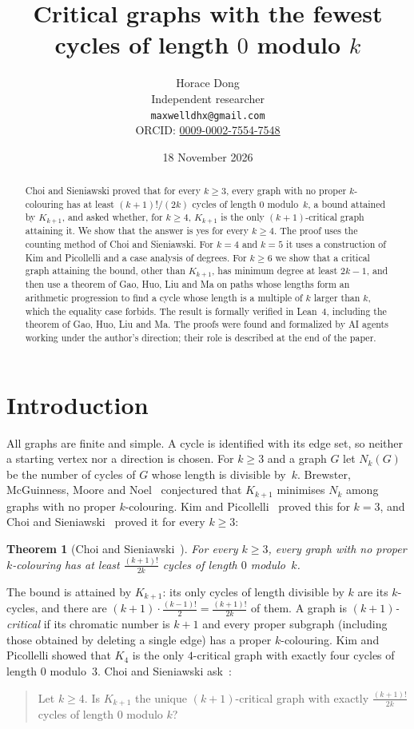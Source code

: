 \documentclass[11pt]{article}
\title{Critical graphs with the fewest cycles of length $0$ modulo $k$}
\author{Horace Dong\\ \small Independent researcher\\
\small\texttt{maxwelldhx@gmail.com}\\
\small ORCID: \href{https://orcid.org/0009-0002-7554-7548}{0009-0002-7554-7548}}
\date{18 November 2026}
\newtheorem{theorem}{Theorem}
\theoremstyle{remark}
\begin{document}
\maketitle

\begin{abstract}
Choi and Sieniawski proved that for every $k\ge3$, every graph with no proper
$k$-colouring has at least $(k+1)!/(2k)$ cycles of length $0$ modulo~$k$, a
bound attained by $K_{k+1}$, and asked whether, for $k\ge4$, $K_{k+1}$ is the
only $(k+1)$-critical graph attaining it. We show that the answer is yes for
every $k\ge4$. The proof uses the counting method of Choi and Sieniawski. For
$k=4$ and $k=5$ it uses a construction of Kim and Picollelli and a case
analysis of degrees. For $k\ge6$ we show that a critical graph attaining the
bound, other than $K_{k+1}$, has minimum degree at least $2k-1$, and then use
a theorem of Gao, Huo, Liu and Ma on paths whose lengths form an arithmetic
progression to find a cycle whose length is a multiple of $k$ larger than $k$,
which the equality case forbids. The result is formally verified in Lean~4,
including the theorem of Gao, Huo, Liu and Ma.
The proofs were found and formalized by AI agents working under the author's
direction; their role is described at the end of the paper.
\end{abstract}

\section{Introduction}

All graphs are finite and simple. A cycle is identified with its edge set, so
neither a starting vertex nor a direction is chosen. For $k\ge3$ and a graph $G$
let $N_k(G)$ be the number of cycles of $G$ whose length is divisible by~$k$.
Brewster, McGuinness, Moore and Noel~\cite{bmmn} conjectured that $K_{k+1}$
minimises $N_k$ among graphs with no proper $k$-colouring. Kim and
Picollelli~\cite{kp} proved this for $k=3$, and Choi and
Sieniawski~\cite{cs} proved it for every $k\ge3$:

\begin{theorem}[{Choi and Sieniawski~\cite[Theorem~3]{cs}}]\label{thm:cs}
For every $k\ge3$, every graph with no proper $k$-colouring has at least
$\frac{(k+1)!}{2k}$ cycles of length $0$ modulo~$k$.
\end{theorem}

The bound is attained by $K_{k+1}$: its only cycles of length divisible by $k$
are its $k$-cycles, and there are $(k+1)\cdot\frac{(k-1)!}{2}=\frac{(k+1)!}{2k}$
of them. A graph is \emph{$(k+1)$-critical} if its chromatic number is $k+1$ and
every proper subgraph (including those obtained by deleting a single edge) has a
proper $k$-colouring. Kim and Picollelli showed that $K_4$ is the only
$4$-critical graph with exactly four cycles of length $0$ modulo~$3$. Choi and
Sieniawski ask~\cite[Question~8]{cs}:
\begin{quote}
Let $k\ge4$. Is $K_{k+1}$ the unique $(k+1)$-critical graph with exactly
$\frac{(k+1)!}{2k}$ cycles of length $0$ modulo $k$?
\end{quote}
\end{document}
